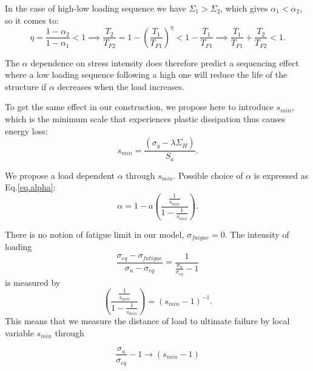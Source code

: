 \documentclass[3p,times,procedia,number]{elsarticle}
\begin{document}
In the case of high-low loading sequence we have $\Sigma_1>\Sigma_2$,  which gives $\alpha_1<\alpha_2$, so it comes to:
$$\eta=\frac{1-\alpha_2}{1-\alpha_1}<1 \implies
\frac{T_2}{T_{F2}}=1-\left( \frac{T_1}{T_{F1}}\right) ^\eta<1-\frac{T_1}{T_{F1}} \implies
\frac{T_1}{T_{F1}}+\frac{T_2}{T_{F2}}<1.$$

The $\alpha$ dependence on stress intensity does therefore predict a sequencing effect where a low loading sequence following a high one will reduce the life of the structure if $\alpha$ decreases when the load increases.

To get the same effect in our construction, we propose here to introduce $s_{min}$, which is the minimum scale that experiences plastic dissipation thus causes energy loss:
\begin{equation}
s_{min}=\dfrac{\left(\sigma_y-\lambda \Sigma_H\right)}{S_{a}}.
\label{eq.smin}
\end{equation}

We propose a load dependent $\alpha$ through $s_{min}$. Possible choice
of $\alpha$ is expressed as Eq.\eqref{eq.alpha}:
\begin{equation}
\alpha=1-a\left( \dfrac{\frac{1}{s_{min}}}{1-\frac{1}{s_{min}}} \right) .
\label{eq.alpha}
\end{equation}

There is no notion of fatigue limit in our model, $\sigma_{faigue}=0$. The intensity of loading
$$\frac{ \sigma_{eq}-\sigma_{fatigue}}{ \sigma_{u} - \sigma_{eq}}= \frac{ 1}{\frac{\sigma_{u}}{\sigma_{eq}} -1}$$
is measured by 
$$\left( \dfrac{\frac{1}{s_{min}}}{1-\frac{1}{s_{min}}}\right) =\left(s_{min}-1 \right) ^{-1}.$$
This means that we measure the distance of load to ultimate failure by local variable $s_{min}$ through 

$$\frac{\sigma_{u}}{\sigma_{eq}} -1 \longrightarrow \left( s_{min}-1\right)  $$
\end{document}
